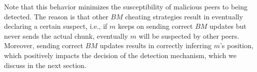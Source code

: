 Note that this behavior minimizes the susceptibility of malicious peers to being detected.
The reason is that other $BM$ cheating strategies result in eventually declaring a certain suspect, i.e., if $m$ keeps on sending correct $BM$ updates but never sends the actual chunk, eventually $m$ will be suspected by other peers.
Moreover, sending correct $BM$ updates results in correctly inferring $m$'s position, which positively impacts the decision of the detection mechanism, which we discuss in the next section. 


% 





